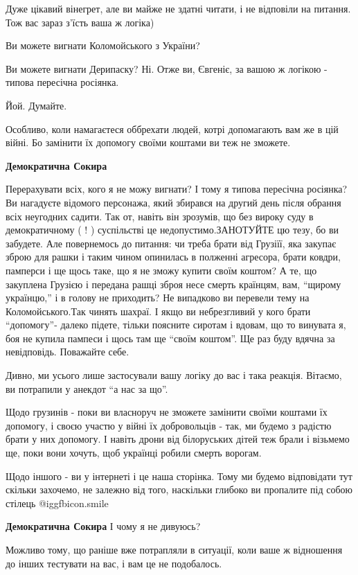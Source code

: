 \begin{itemize}
\begin{itemize}

Дуже цікавий вінегрет, але ви майже не здатні читати, і не відповіли на
питання. Тож вас зараз з'їсть ваша ж логіка)

Ви можете вигнати Коломойського з України?

Ви можете вигнати Дерипаску? Ні. Отже ви, Євгеніє, за вашою ж логікою - типова
пересічна росіянка.

Йой. Думайте.

Особливо, коли намагаєтеся оббрехати людей, котрі допомагають вам же в цій
війні. Бо замінити їх допомогу своїми коштами ви теж не зможете.

\textbf{Демократична Сокира} 

Перерахувати всіх, кого я не можу вигнати? І тому я типова пересічна росіянка?
Ви нагадуєте відомого персонажа, який збирався на другий день після обрання
всіх неугодних садити. Так от, навіть він зрозумів, що без вироку суду в
демократичному ( ! ) суспільстві це недопустимо.ЗАНОТУЙТЕ цю тезу, бо ви
забудете. Але повернемось до питання: чи треба брати від Грузіїї, яка закупає
зброю для рашки і таким чином опинилась в полженні агресора, брати ковдри,
памперси і ще щось таке, що я не зможу купити своїм коштом? А те, що закуплена
Грузією і передана рашці зброя несе смерть країнцям, вам, \enquote{щирому українцю,} і
в голову не приходить? Не випадково ви перевели тему на Коломойського.Так
чинять шахраї. І якщо ви небрезгливий у кого брати \enquote{допомогу}- далеко підете,
тільки поясните сиротам і вдовам, що то винувата я, боя не купила пампеси і
щось там ще \enquote{своїм коштом}.  Ще раз буду вдячна за невідповідь. Поважайте себе.


Дивно, ми усього лише застосували вашу логіку до вас і така реакція. Вітаємо,
ви потрапили у анекдот \enquote{а нас за що}.

Щодо грузинів - поки ви власноруч не зможете замінити своїми коштами їх
допомогу, і своєю участю у війні їх добровольців - так, ми будемо з радістю
брати у них допомогу. І навіть дрони від білоруських дітей теж брали і візьмемо
ще, поки вони хочуть, щоб українці робили смерть ворогам.

Щодо іншого - ви у інтернеті і це наша сторінка. Тому ми будемо відповідати тут
скільки захочемо, не залежно від того, наскільки глибоко ви пропалите під собою
стілець  @igg{fbicon.smile} 

\textbf{Демократична Сокира} І чому я не дивуюсь?

\end{itemize} %


Можливо тому, що раніше вже потрапляли в ситуації, коли ваше ж відношення до
інших тестувати на вас, і вам це не подобалось.

\end{itemize} %
